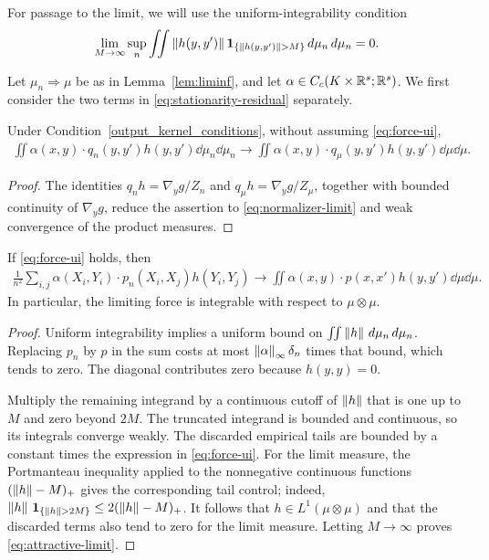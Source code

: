 For passage to the limit, we will use the uniform-integrability condition
\begin{align}\label{eq:force-ui}
\lim_{M\to\infty}\sup_n\iint\left\lVert h(y,y')\right\rVert
\mathbf 1_{\{\left\lVert h(y,y')\right\rVert>M\}}\,d\mu_n\,d\mu_n=0.
\end{align}

Let $\mu_n\Rightarrow\mu$ be as in Lemma~\ref{lem:liminf}, and let $\alpha\in C_c(K\times\mathbb{R}^s;\mathbb{R}^s)$. We first consider the two terms in \eqref{eq:stationarity-residual} separately.

\begin{lemma}\label{lem:repulsive}
Under Condition~\ref{output_kernel_conditions}, without assuming \eqref{eq:force-ui},
\begin{align}\label{eq:repulsive-limit}
\iint\alpha(x,y)\cdot q_n(y,y')h(y,y')\dd\mu_n\dd\mu_n
\longrightarrow
\iint\alpha(x,y)\cdot q_\mu(y,y')h(y,y')\dd\mu\dd\mu.
\end{align}
\end{lemma}
\begin{proof}
The identities $q_nh=\nabla_y g/Z_n$ and $q_\mu h=\nabla_y g/Z_\mu$, together with bounded continuity of $\nabla_y g$, reduce the assertion to \eqref{eq:normalizer-limit} and weak convergence of the product measures.
\end{proof}

\begin{lemma}\label{lem:attractive}
If \eqref{eq:force-ui} holds, then
\begin{align}\label{eq:attractive-limit}
\frac1{n^2}\sum_{i,j}\alpha(X_i,Y_i)\cdot p_n(X_i,X_j)h(Y_i,Y_j)
\longrightarrow
\iint\alpha(x,y)\cdot p(x,x')h(y,y')\dd\mu\dd\mu.
\end{align}
In particular, the limiting force is integrable with respect to $\mu\otimes\mu$.
\end{lemma}
\begin{proof}
Uniform integrability implies a uniform bound on $\iint\left\lVert h\right\rVert\,d\mu_n\,d\mu_n$. Replacing $p_n$ by $p$ in the sum costs at most $\left\lVert\alpha\right\rVert_\infty\delta_n$ times that bound, which tends to zero. The diagonal contributes zero because $h(y,y)=0$.

Multiply the remaining integrand by a continuous cutoff of $\left\lVert h\right\rVert$ that is one up to $M$ and zero beyond $2M$. The truncated integrand is bounded and continuous, so its integrals converge weakly. The discarded empirical tails are bounded by a constant times the expression in \eqref{eq:force-ui}. For the limit measure, the Portmanteau inequality applied to the nonnegative continuous functions $(\left\lVert h\right\rVert-M)_+$ gives the corresponding tail control; indeed,
$\left\lVert h\right\rVert\,\mathbf 1_{\{\left\lVert h\right\rVert>2M\}}\leq2(\left\lVert h\right\rVert-M)_+$.
It follows that $h\in L^1(\mu\otimes\mu)$ and that the discarded terms also tend to zero for the limit measure. Letting $M\to\infty$ proves \eqref{eq:attractive-limit}.
\end{proof}

